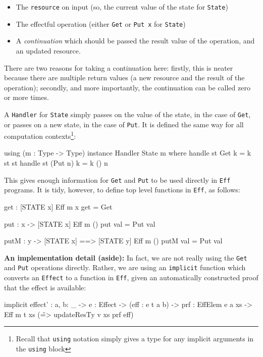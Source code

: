 \begin{itemize}
\item The \texttt{resource} on input (so, the current value of the state for
\texttt{State})
\item The effectful operation (either \texttt{Get} or \texttt{Put x} for
\texttt{State})
\item A \emph{continuation} which should be passed the result value of the
operation, and an updated resource.
\end{itemize}

\noindent
There are two reasons for taking a continuation here: firstly, this is neater
because there are multiple return values (a new resource and the result of
the operation); secondly, and more importantly, the continuation can be called
zero or more times.

A \texttt{Handler} for \texttt{State} simply passes on the value of the state,
in the case of \texttt{Get}, or passes on a new state, in the case of \texttt{Put}.
It is defined the same way for all computation contexts\footnote{Recall that
\texttt{using} notation simply gives a type for any implicit arguments in
the \texttt{using} block}:

\begin{code}
using (m : Type -> Type)
  instance Handler State m where
     handle st Get     k = k st st
     handle st (Put n) k = k () n
\end{code}

\noindent
This gives enough information for \texttt{Get} and \texttt{Put} to be used
directly in \texttt{Eff} programs. It is tidy, however, to define top level
functions in \texttt{Eff}, as follows:

\begin{code}
get : { [STATE x] } Eff m x
get = Get

put : x -> { [STATE x] } Eff m () 
put val = Put val

putM : y -> { [STATE x] ==> [STATE y] } Eff m () 
putM val = Put val
\end{code}

\noindent
\textbf{An implementation detail (aside):} In fact, we are not really using
the \texttt{Get} and \texttt{Put} operations directly. Rather, we are using
an \texttt{implicit} function which converts an \texttt{Effect} to a 
function in \texttt{Eff}, given an automatically constructed proof that the
effect is available:

\begin{code}
implicit
effect' : {a, b: _} -> {e : Effect} ->
          (eff : e t a b) ->
          {prf : EffElem e a xs} ->
          Eff m t xs (\v => updateResTy v xs prf eff)
\end{code}

